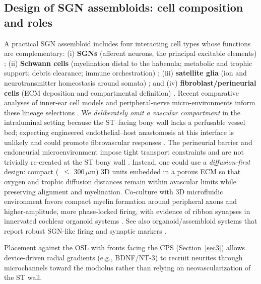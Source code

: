 \documentclass[referee,pdflatex, sn-vancouver-num]{sn-jnl}%
\theoremstyle{thmstyleone}%
\theoremstyle{thmstyletwo}%
\theoremstyle{thmstylethree}%
\begin{document}
\subsection{Design of SGN assembloids: cell composition and roles}
A practical SGN assembloid includes four interacting cell types whose functions are complementary: (i) \textbf{SGNs} (afferent neurons, the principal excitable elements) \cite{matsuoka_2017}; (ii) \textbf{Schwann cells} (myelination distal to the habenula; metabolic and trophic support; debris clearance; immune orchestration) \citep{Oliveira2023FrontiersPN,Moss2024iScience}; (iii) \textbf{satellite glia} (ion and neurotransmitter homeostasis around somata) \cite{Meas2018}; and (iv) \textbf{fibroblast/perineurial cells} (ECM deposition and compartmental definition) \cite{Constantin2024}. 
Recent comparative analyses of inner‑ear cell models and peripheral‑nerve micro-environments inform these lineage selections \cite{vanDerValk2023_CellRep, Jiang2024_EBioMedicine}. We \emph{deliberately omit a vascular compartment} in the intraluminal setting because the ST–facing bony wall lacks a perfusable vessel bed; expecting engineered endothelial–host anastomosis at this interface is unlikely and could promote fibrovascular responses \cite{Wright2018}. The perineurial barrier and endoneurial microenvironment impose tight transport constraints and are not trivially re‑created at the ST bony wall \cite{Iwanaga2022_BiomedRes, Jiang2024_EBioMedicine}. Instead, one could use a \emph{diffusion‑first} design: compact (~\(\leq\) 300\,\(\mu\)m) 3D units embedded in a porous ECM so that oxygen and trophic diffusion distances remain within avascular limits while preserving alignment and myelination. Co‑culture with 3D microfluidic environment favors compact myelin formation around peripheral axons and higher‑amplitude, more phase‑locked firing, with evidence of ribbon synapses in innervated cochlear organoid systems \citep{Xia2023StemCellReports}. See also organoid/assembloid systems that report robust SGN‑like firing and synaptic markers \cite{Moore2025_CellStemCell}.

Placement against the OSL with fronts facing the CPS (Section~\ref{sec3}) allows device-driven radial gradients (e.g., BDNF/NT-3) to recruit neurites through microchannels toward the modiolus rather than relying on neovascularization of the ST wall.
\end{document}
